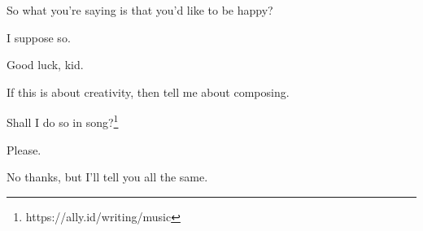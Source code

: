 \begin{paracol}{2}
\begin{leftcolumn}
\begin{ally}
So what you're saying is that you'd like to be happy?
\end{ally}
I suppose so.

\begin{ally}
Good luck, kid.
\end{ally}
\newpage

\begin{ally}
If this is about creativity, then tell me about composing.
\end{ally}
Shall I do so in song?\footnote{https://ally.id/writing/music}

\begin{ally}
Please.
\end{ally}
No thanks, but I'll tell you all the same.
\newpage
\end{leftcolumn}
\end{paracol}
